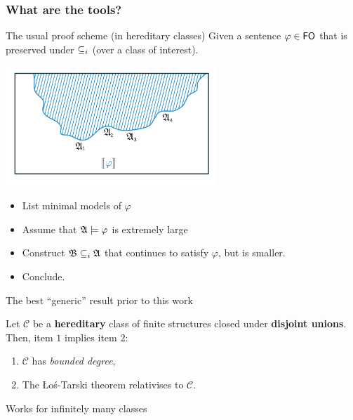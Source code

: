 \documentclass{beamer}
\begin{document}
\subsubsection{What are the tools?}

\begin{frame}{The usual proof scheme \hfill (in hereditary classes)}
    Given a sentence $\varphi \in \mathsf{FO}$ that is preserved under $\mathrel{\subseteq_i}$ (over a class of interest).
    \begin{center}
        \includegraphics[width=8cm]{figures/quizz_Page 12.png}
    \end{center}
    \pause
    \begin{itemize}
        \item List minimal models of $\varphi$
        \item Assume that $\mathfrak{A} \models \varphi$ is extremely large
        \item Construct $\mathfrak{B} \mathrel{\subseteq_i} \mathfrak{A}$ that continues
            to satisfy $\varphi$, but is smaller.
        \item Conclude.
    \end{itemize}
\end{frame}


\begin{frame}{The best ``generic'' result prior to this work}
    \begin{theorem}
        \vspace{0.1em}
        Let $\mathcal{C}$ be a \textbf{hereditary} class of finite structures
        closed under \textbf{disjoint unions}.
        Then, item $1$ implies item $2$:
        \begin{enumerate}
            \item $\mathcal{C}$ has \emph{bounded degree},
            \item The Łoś-Tarski theorem relativises to $\mathcal{C}$.
        \end{enumerate}
    \end{theorem}
    \pause
    \begin{block}{Works for infinitely many classes}
    \end{block}
\end{frame}
\end{document}
